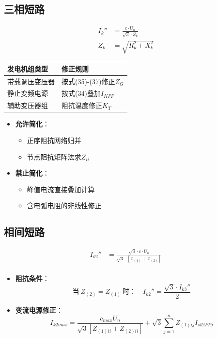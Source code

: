 \documentclass[a4paper,11pt,AutoFakeBold]{ctexart}
\begin{document}
\subsection{三相短路}

\begin{align}
I_k'' &= \frac{c \cdot U_n}{\sqrt{3} \cdot Z_k} \label{eq:ik} \\
Z_k &= \sqrt{R_k^2 + X_k^2} \label{eq:zk}
\end{align}


\begin{tabular}{ll}
发电机组类型 & 修正规则 \\
\hline
带载调压变压器 & 按式(35)-(37)修正$Z_G$ \\
静止变频电源 & 按式(34)叠加$I_{KPF}$ \\
辅助变压器组 & 阻抗温度修正$K_T$ \\
\end{tabular}


\begin{itemize}
\item \textbf{允许简化}：
  \begin{itemize}
  \item 正序阻抗网络归并
  \item 节点阻抗矩阵法求$Z_{ii}$
  \end{itemize}
  
\item \textbf{禁止简化}：
  \begin{itemize}
  \item 峰值电流直接叠加计算
  \item 含电弧电阻的非线性修正
  \end{itemize}
\end{itemize}


\subsection{相间短路}

\begin{align}
I_{k2}'' &= \frac{\sqrt{3}\cdot c \cdot U_n}{\sqrt{3} \cdot [Z_{(1)} + Z_{(2)}]} \label{eq:ik2} \\
\end{align}


\begin{itemize}
\item \textbf{阻抗条件}：
  \[ \text{当}\ Z_{(2)} = Z_{(1)}\ \text{时：} \quad I_{k2}'' = \frac{\sqrt{3}\cdot I_{k3}''}{2} \]
  
\item \textbf{变流电源修正}：
  \begin{equation}
  I_{k2max} = \frac{c_{max}U_n}{\sqrt{3}[Z_{(1)ii} + Z_{(2)ii}]} + \sqrt{3}\sum_{j=1}^{n}Z_{(1)ij}I_{sk2PFj} 
  \end{equation}
\end{itemize}
\end{document}
